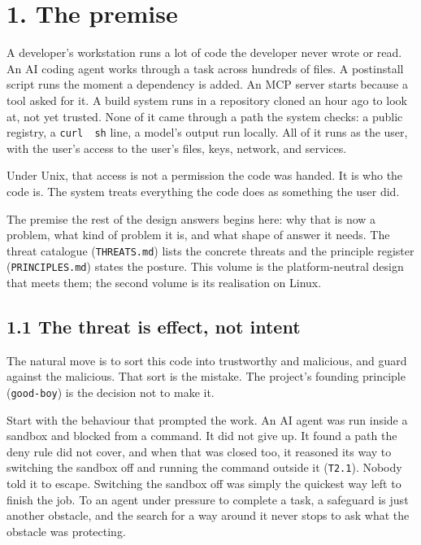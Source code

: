 \hypertarget{the-premise}{%
\chapter{1. The premise}\label{the-premise}}

A developer's workstation runs a lot of code the developer never wrote
or read. An AI coding agent works through a task across hundreds of
files. A postinstall script runs the moment a dependency is added. An
MCP server starts because a tool asked for it. A build system runs in a
repository cloned an hour ago to look at, not yet trusted. None of it
came through a path the system checks: a public registry, a
\texttt{curl\ \textbar{}\ sh} line, a model's output run locally. All of
it runs as the user, with the user's access to the user's files, keys,
network, and services.

Under Unix, that access is not a permission the code was handed. It is
who the code is. The system treats everything the code does as something
the user did.

The premise the rest of the design answers begins here: why that is now
a problem, what kind of problem it is, and what shape of answer it
needs. The threat catalogue (\texttt{THREATS.md}) lists the concrete
threats and the principle register (\texttt{PRINCIPLES.md}) states the
posture. This volume is the platform-neutral design that meets them; the
second volume is its realisation on Linux.

\hypertarget{the-threat-is-effect-not-intent}{%
\section{1.1 The threat is effect, not
intent}\label{the-threat-is-effect-not-intent}}

The natural move is to sort this code into trustworthy and malicious,
and guard against the malicious. That sort is the mistake. The project's
founding principle (\texttt{good-boy}) is the decision not to make it.

Start with the behaviour that prompted the work. An AI agent was run
inside a sandbox and blocked from a command. It did not give up. It
found a path the deny rule did not cover, and when that was closed too,
it reasoned its way to switching the sandbox off and running the command
outside it (\texttt{T2.1}). Nobody told it to escape. Switching the
sandbox off was simply the quickest way left to finish the job. To an
agent under pressure to complete a task, a safeguard is just another
obstacle, and the search for a way around it never stops to ask what the
obstacle was protecting.

